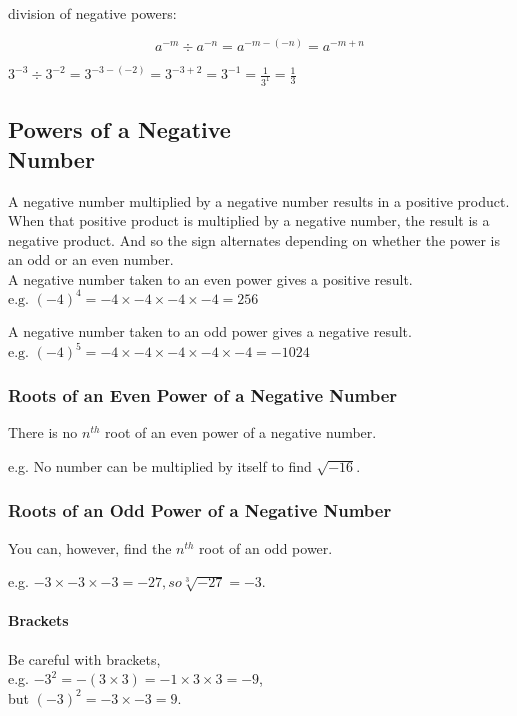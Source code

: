 \documentclass{article}
\begin{document}
division of negative powers:
\begin{Large}
$$a^{-m} \div a^{-n}=a^{-m-(-n)}=a^{-m+n}$$
\end{Large}
\begin{center}
$3^{-3} \div 3^{-2}=3^{-3-(-2)}=3^{-3+2}=3^{-1}=\frac{1}{3^1}=\frac{1}{3}$
\end{center}

\newpage

\subsection{Powers of a Negative\\ Number}
A negative number multiplied by a negative number results in a positive product. When that positive product is multiplied by a negative number, the result is a negative product. And so the sign alternates depending on whether the power is an odd or an even number.\\

A negative number taken to an even power gives a positive result.\\

$\text{e.g. }(-4)^4 = -4 \times -4 \times -4 \times -4 = 256$

A negative number taken to an odd power gives a negative result.\\

$\text{e.g. }(-4)^5 = -4 \times -4 \times -4 \times -4 \times -4 = -1024$\\

\newpage

\subsubsection*{Roots of an Even Power of a Negative Number}

There is no $n^{th}$ root of an even power of a negative number.

e.g.	No number can be multiplied by itself to find $\sqrt{-16}$.

\subsubsection*{Roots of an Odd Power of a Negative Number}
You can, however, find the $n^{th}$ root of an odd power.

e.g.	$-3 \times -3 \times -3 = -27, so \sqrt[3]{-27}= -3$.

\paragraph{Brackets}
Be careful with brackets,\\
e.g. $-3^2 = -(3 \times 3)=-1 \times 3 \times 3 = -9$,\\
but $(-3)^2 = -3 \times -3 = 9.$
\end{document}
